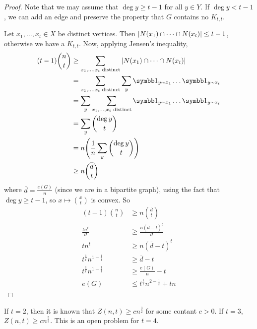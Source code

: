 \begin{proof}
	Note that we may assume that \( \deg y \geq t - 1 \) for all \( y \in Y \).
	If \( \deg y < t - 1 \), we can add an edge and preserve the property that \( G \) contains no \( K_{t,t} \).

	Let \( x_1, \dots, x_t \in X \) be distinct vertices.
	Then \( \abs{N(x_1) \cap \dots \cap N(x_t)} \leq t - 1 \), otherwise we have a \( K_{t,t} \).
	Now, applying Jensen's inequality,
	\begin{align*}
		(t-1) \binom n t &\geq \sum_{x_1, \dots, x_t \text{ distinct}} \abs{N(x_1) \cap \dots \cap N(x_t)} \\
		&= \sum_{x_1, \dots, x_t \text{ distinct}} \sum_y \symbb 1_{y \sim x_1} \dots \symbb 1_{y \sim x_t} \\
		&= \sum_y \sum_{x_1, \dots, x_t \text{ distinct}} \symbb 1_{y \sim x_1} \dots \symbb 1_{y \sim x_t} \\
		&= \sum_y \binom{\deg y}{t} \\
		&= n \qty( \frac{1}{n} \sum_y \binom{\deg y}{t} ) \\
		&\geq n \binom{\overline d}{t}
	\end{align*}
	where \( \overline d = \frac{e(G)}{n} \) (since we are in a bipartite graph), using the fact that \( \deg y \geq t - 1 \), so \( x \mapsto \binom x t \) is convex.
	So
	\begin{align*}
		(t-1) \binom n t &\geq n \binom{\overline d}{t} \\
		\frac{tn^t}{t!} &\geq \frac{n(\overline d - t)^t}{t!} \\
		tn^t &\geq n(\overline d - t)^t \\
		t^{\frac{1}{t}} n^{1 - \frac{1}{t}} &\geq \overline d - t \\
		t^{\frac{1}{t}} n^{1 - \frac{1}{t}} &\geq \frac{e(G)}{n} - t \\
		e(G) &\leq t^{\frac{1}{t}} n^{2 - \frac{1}{t}} + tn
	\end{align*}
\end{proof}
\begin{remark}
	If \( t = 2 \), then it is known that \( Z(n,t) \geq cn^{\frac{3}{2}} \) for some contant \( c > 0 \).
	If \( t = 3 \), \( Z(n,t) \geq cn^{\frac{5}{3}} \).
	This is an open problem for \( t = 4 \).
\end{remark}

